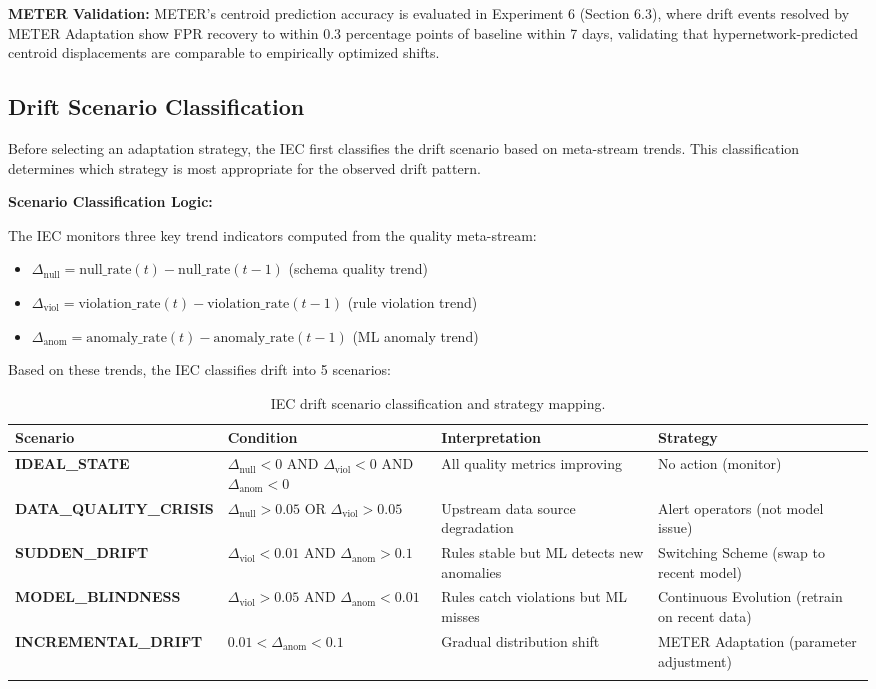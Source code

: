 \textbf{METER Validation:} METER's centroid prediction accuracy is evaluated in Experiment 6 (Section 6.3), where drift events resolved by METER Adaptation show FPR recovery to within 0.3 percentage points of baseline within 7 days, validating that hypernetwork-predicted centroid displacements are comparable to empirically optimized shifts.

\subsection{Drift Scenario Classification}

Before selecting an adaptation strategy, the IEC first classifies the drift scenario based on meta-stream trends. This classification determines which strategy is most appropriate for the observed drift pattern.

\textbf{Scenario Classification Logic:}

The IEC monitors three key trend indicators computed from the quality meta-stream:

\begin{itemize}
    \item $\Delta_{\text{null}} = \text{null\_rate}(t) - \text{null\_rate}(t-1)$ (schema quality trend)
    \item $\Delta_{\text{viol}} = \text{violation\_rate}(t) - \text{violation\_rate}(t-1)$ (rule violation trend)
    \item $\Delta_{\text{anom}} = \text{anomaly\_rate}(t) - \text{anomaly\_rate}(t-1)$ (ML anomaly trend)
\end{itemize}

Based on these trends, the IEC classifies drift into 5 scenarios:

\begin{longtable}{|m{3cm}|m{4.5cm}|m{3cm}|m{3cm}|}
\hline
\textbf{Scenario} & \textbf{Condition} & \textbf{Interpretation} & \textbf{Strategy} \\ \hline
\textbf{IDEAL\_STATE} & $\Delta_{\text{null}} < 0$ AND $\Delta_{\text{viol}} < 0$ AND $\Delta_{\text{anom}} < 0$ & All quality metrics improving & No action (monitor) \\ \hline
\textbf{DATA\_QUALITY\_CRISIS} & $\Delta_{\text{null}} > 0.05$ OR $\Delta_{\text{viol}} > 0.05$ & Upstream data source degradation & Alert operators (not model issue) \\ \hline
\textbf{SUDDEN\_DRIFT} & $\Delta_{\text{viol}} < 0.01$ AND $\Delta_{\text{anom}} > 0.1$ & Rules stable but ML detects new anomalies & Switching Scheme (swap to recent model) \\ \hline
\textbf{MODEL\_BLINDNESS} & $\Delta_{\text{viol}} > 0.05$ AND $\Delta_{\text{anom}} < 0.01$ & Rules catch violations but ML misses & Continuous Evolution (retrain on recent data) \\ \hline
\textbf{INCREMENTAL\_DRIFT} & $0.01 < \Delta_{\text{anom}} < 0.1$ & Gradual distribution shift & METER Adaptation (parameter adjustment) \\ \hline
\caption{IEC drift scenario classification and strategy mapping.}
\label{tab:iec_scenarios}
\end{longtable}

